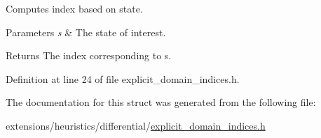 Computes index based on state. 


\begin{DoxyParams}{Parameters}
{\em s} & The state of interest. \\
\hline
\end{DoxyParams}
\begin{DoxyReturn}{Returns}
The index corresponding to {\ttfamily s}. 
\end{DoxyReturn}


Definition at line 24 of file explicit\+\_\+domain\+\_\+indices.\+h.



The documentation for this struct was generated from the following file\+:\begin{DoxyCompactItemize}
\item 
extensions/heuristics/differential/\hyperlink{explicit__domain__indices_8h}{explicit\+\_\+domain\+\_\+indices.\+h}\end{DoxyCompactItemize}

